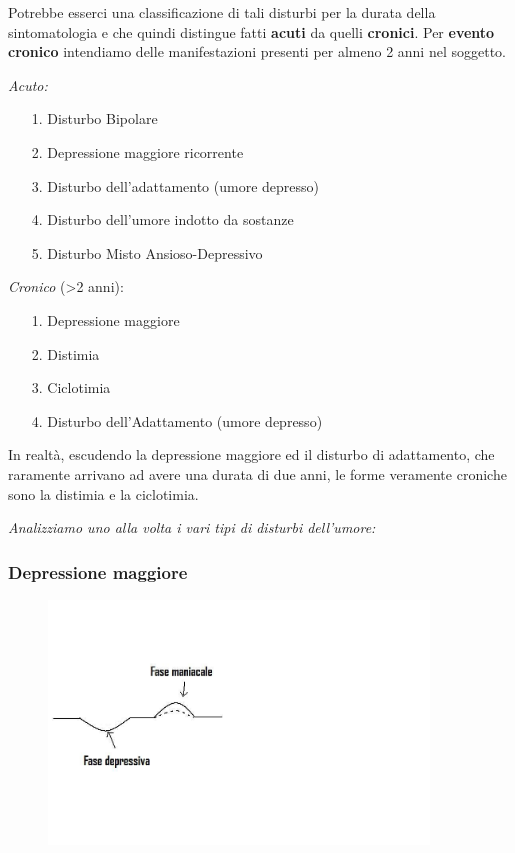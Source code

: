 Potrebbe esserci una classificazione di tali disturbi per la durata
della sintomatologia e che quindi distingue fatti \textbf{acuti} da
quelli \textbf{cronici}. Per \textbf{evento cronico} intendiamo delle
manifestazioni presenti per almeno 2 anni nel soggetto.

\emph{Acuto:}

\begin{itemize}
\item[1.]
  Disturbo Bipolare
\item[2.]
  Depressione maggiore ricorrente
\item[3.]
  Disturbo dell'adattamento (umore depresso)
\item[4.]
  Disturbo dell'umore indotto da sostanze
\item[5.]
  Disturbo Misto Ansioso-Depressivo
\end{itemize}

\emph{Cronico} (\textgreater{}2 anni):

\begin{itemize}
\item[1.]
  Depressione maggiore
\item[2.]
  Distimia
\item[3.]
  Ciclotimia
\item[4.]
  Disturbo dell'Adattamento (umore depresso)
\end{itemize}

In realtà, escudendo la depressione maggiore ed il disturbo di
adattamento, che raramente arrivano ad avere una durata di due anni, le
forme veramente croniche sono la distimia e la ciclotimia.

\emph{Analizziamo uno alla volta i vari tipi di disturbi dell'umore:}

\subsubsection{Depressione maggiore}

\begin{figure}[!ht]
\centering
	\includegraphics[width=0.9\textwidth]{02/image1.jpeg}
\end{figure}

